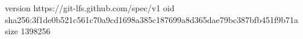 version https://git-lfs.github.com/spec/v1
oid sha256:3f1de0b521c561c70a9cd1698a385c187699a8d365dae79bc387bfb451f9b71a
size 1398256
